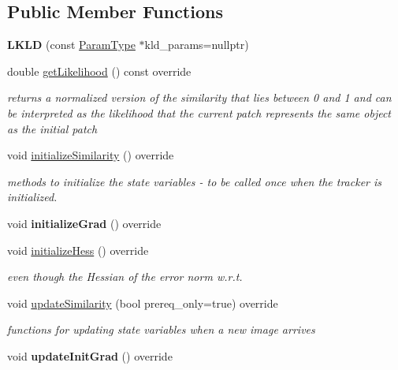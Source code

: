 \subsection*{Public Member Functions}
\begin{DoxyCompactItemize}
\item 
\hypertarget{classLKLD_aa2003fd0c95914e829b465274a65fd4e}{{\bfseries L\-K\-L\-D} (const \hyperlink{structLKLDParams}{Param\-Type} $\ast$kld\-\_\-params=nullptr)}\label{classLKLD_aa2003fd0c95914e829b465274a65fd4e}

\item 
\hypertarget{classLKLD_a806af8a7ea9ae596fe37dcecdc5f1a07}{double \hyperlink{classLKLD_a806af8a7ea9ae596fe37dcecdc5f1a07}{get\-Likelihood} () const override}\label{classLKLD_a806af8a7ea9ae596fe37dcecdc5f1a07}

\begin{DoxyCompactList}\small\item\em returns a normalized version of the similarity that lies between 0 and 1 and can be interpreted as the likelihood that the current patch represents the same object as the initial patch \end{DoxyCompactList}\item 
void \hyperlink{classLKLD_ae5273cb7b090aeb7ab68ed27179827ba}{initialize\-Similarity} () override
\begin{DoxyCompactList}\small\item\em methods to initialize the state variables -\/ to be called once when the tracker is initialized. \end{DoxyCompactList}\item 
\hypertarget{classLKLD_ad0ac664aff76014f7a518c42a05712f9}{void {\bfseries initialize\-Grad} () override}\label{classLKLD_ad0ac664aff76014f7a518c42a05712f9}

\item 
void \hyperlink{classLKLD_aaae14b585d8913ca82b8723172462985}{initialize\-Hess} () override
\begin{DoxyCompactList}\small\item\em even though the Hessian of the error norm w.\-r.\-t. \end{DoxyCompactList}\item 
void \hyperlink{classLKLD_ad664366d84f9734dc98217f9018be72e}{update\-Similarity} (bool prereq\-\_\-only=true) override
\begin{DoxyCompactList}\small\item\em functions for updating state variables when a new image arrives \end{DoxyCompactList}\item 
\hypertarget{classLKLD_a33345eff687ac0e59775d42693316782}{void {\bfseries update\-Init\-Grad} () override}\label{classLKLD_a33345eff687ac0e59775d42693316782}


\end{DoxyCompactItemize}
